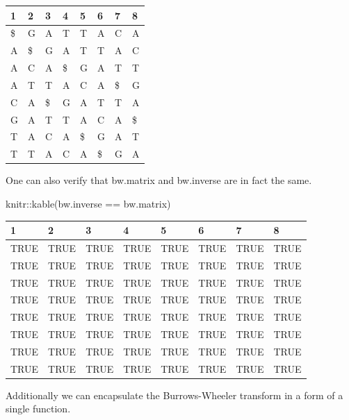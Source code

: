 \documentclass[
]{book}
\newenvironment{Shaded}{\begin{snugshade}}{\end{snugshade}}
\newcommand{\FunctionTok}[1]{\textcolor[rgb]{0.00,0.00,0.00}{#1}}
\newcommand{\NormalTok}[1]{#1}
\newcommand{\SpecialCharTok}[1]{\textcolor[rgb]{0.00,0.00,0.00}{#1}}
\begin{document}
\begin{tabular}{l|l|l|l|l|l|l|l}
\hline
1 & 2 & 3 & 4 & 5 & 6 & 7 & 8\\
\hline
\$ & G & A & T & T & A & C & A\\
\hline
A & \$ & G & A & T & T & A & C\\
\hline
A & C & A & \$ & G & A & T & T\\
\hline
A & T & T & A & C & A & \$ & G\\
\hline
C & A & \$ & G & A & T & T & A\\
\hline
G & A & T & T & A & C & A & \$\\
\hline
T & A & C & A & \$ & G & A & T\\
\hline
T & T & A & C & A & \$ & G & A\\
\hline
\end{tabular}

One can also verify that bw.matrix and bw.inverse are in fact the same.

\begin{Shaded}
\begin{Highlighting}[numbers=left,,]
\NormalTok{knitr}\SpecialCharTok{::}\FunctionTok{kable}\NormalTok{(bw.inverse }\SpecialCharTok{==}\NormalTok{ bw.matrix)}
\end{Highlighting}
\end{Shaded}

\begin{tabular}{l|l|l|l|l|l|l|l}
\hline
1 & 2 & 3 & 4 & 5 & 6 & 7 & 8\\
\hline
TRUE & TRUE & TRUE & TRUE & TRUE & TRUE & TRUE & TRUE\\
\hline
TRUE & TRUE & TRUE & TRUE & TRUE & TRUE & TRUE & TRUE\\
\hline
TRUE & TRUE & TRUE & TRUE & TRUE & TRUE & TRUE & TRUE\\
\hline
TRUE & TRUE & TRUE & TRUE & TRUE & TRUE & TRUE & TRUE\\
\hline
TRUE & TRUE & TRUE & TRUE & TRUE & TRUE & TRUE & TRUE\\
\hline
TRUE & TRUE & TRUE & TRUE & TRUE & TRUE & TRUE & TRUE\\
\hline
TRUE & TRUE & TRUE & TRUE & TRUE & TRUE & TRUE & TRUE\\
\hline
TRUE & TRUE & TRUE & TRUE & TRUE & TRUE & TRUE & TRUE\\
\hline
\end{tabular}

Additionally we can encapsulate the Burrows-Wheeler transform in a form of a single function.
\end{document}
